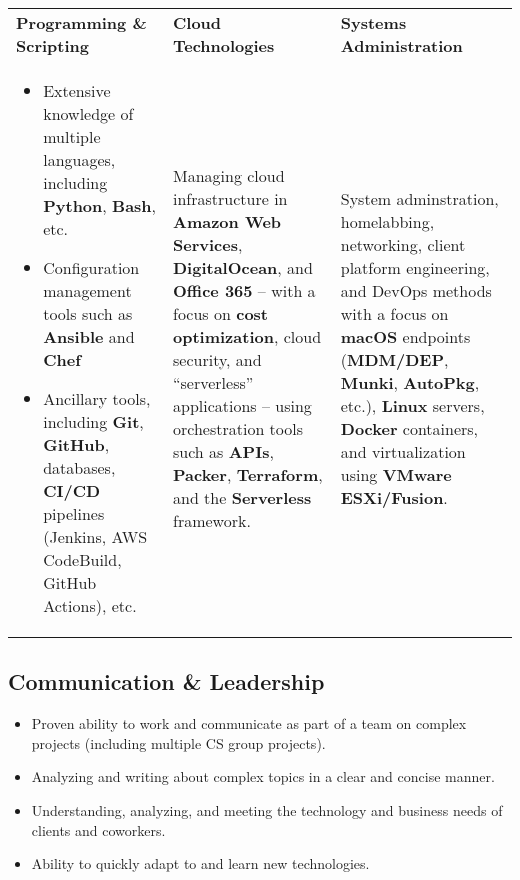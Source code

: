 \documentclass[10pt]{article}
\newcommand{\afterlistspace}[0]{\vspace{-1.5em}}
\begin{document}
\begin{tabularx}{\linewidth}{
    >{\hsize=1\hsize}X|%
    >{\hsize=1\hsize}X|%
    >{\hsize=1\hsize}X%
  }
    \textbf{Programming \& Scripting}
    & \textbf{Cloud Technologies}
    & \textbf{Systems Administration}
    \\
    \begin{itemize}[noitemsep,topsep=0pt]
        \vspace{-0.75em}

        \item Extensive knowledge of multiple languages, including \textbf{Python}, \textbf{Bash}, etc.

        \item Configuration management tools such as \textbf{Ansible} and \textbf{Chef}

        \item Ancillary tools, including \textbf{Git}, \textbf{GitHub}, databases, \textbf{CI/CD} pipelines (Jenkins, AWS CodeBuild, GitHub Actions), etc.
        
        \afterlistspace
    \end{itemize}

    & Managing cloud infrastructure in \textbf{Amazon Web Services}, \textbf{DigitalOcean}, and \textbf{Office 365} -- with a focus on \textbf{cost optimization}, cloud security, and ``serverless'' applications -- using orchestration tools such as \textbf{APIs}, \textbf{Packer}, \textbf{Terraform}, and the \textbf{Serverless} framework.

    & System adminstration, homelabbing, networking, client platform engineering, and DevOps methods with a focus on \textbf{macOS} endpoints (\textbf{MDM/DEP}, \textbf{Munki}, \textbf{AutoPkg}, etc.), \textbf{Linux} servers, \textbf{Docker} containers, and virtualization using \textbf{VMware ESXi/Fusion}.
    
\end{tabularx}


\subsection{Communication \& Leadership}

\begin{itemize}

    \item Proven ability to work and communicate as part of a team on complex projects (including multiple CS group projects).

    \item Analyzing and writing about complex topics in a clear and concise manner.

    \item Understanding, analyzing, and meeting the technology and business needs of clients and coworkers.

    \item Ability to quickly adapt to and learn new technologies.

\end{itemize}
\end{document}
